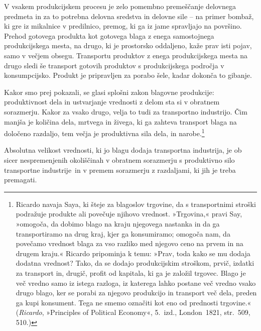 \documentclass[kapital_02.tex]{subfiles}
\begin{document}
V vsakem produkcijskem procesu je zelo pomembno premeščanje delovnega predmeta in za to potrebna delovna sredstva in delovne sile -- na primer bombaž, ki gre iz mikalnice v predilnico, premog, ki ga iz jame spravljajo na površino.
Prehod gotovega produkta kot gotovega blaga z enega samostojnega produkcijskega mesta, na drugo, ki je prostorsko oddaljeno, kaže prav isti pojav, samo v večjem obsegu.
Transportu produktov z enega produkcijskega mesta na drugo sledi še transport gotovih produktov s produkcijskega področja v konsumpcijsko. 
Produkt je pripravljen za porabo šele, kadar dokonča to gibanje.

Kakor smo prej pokazali, se glasi splošni zakon blagovne produkcije: produktivnost dela in ustvarjanje vrednosti z delom sta si v obratnem sorazmerju.
Kakor za vsako drugo, velja to tudi za transportno industrijo.
Čim manjša je količina dela, mrtvega in živega, ki ga zahteva transport blaga na določeno razdaljo, tem večja je produktivna sila dela, in narobe.\footnote
{Ricardo navaja Saya, ki šteje za blagoslov trgovine, da s transportnimi stroški podražuje produkte ali povečuje njihovo vrednost.
»Trgovina,« pravi Say, »omogoča, da dobimo blago na kraju njegovega nastanka in da ga transportiramo na drug kraj, kjer ga konsumiramo; omogoča nam, da povečamo vrednost blaga za vso razliko med njegovo ceno na prvem in na drugem kraju.«
Ricardo pripominja k temu: »Prav, toda kako se mu dodaja dodatna vrednost?
Tako, da se dodajo produkcijskim stroškom, prvič, izdatki za transport in, drugič, profit od kapitala, ki ga je založil trgovec.
Blago je več vredno samo iz istega razloga, iz katerega lahko postane več vredno vsako drugo blago, ker se porabi za njegovo produkcijo in transport več dela, preden ga kupi konsument.
Tega ne smemo označiti kot eno od prednosti trgovine.«
(\emph{Ricardo}, »Principles of Political Economy«, 5.\ izd., London\ 1821, str.\ 509, 510.)}

Absolutna velikost vrednosti, ki jo blagu dodaja transportna industrija, je ob sicer nespremenjenih okoliščinah v obratnem sorazmerju s produktivno silo transportne industrije\KPEstran\ in v premem sorazmerju z razdaljami, ki jih je treba premagati.
\end{document}
